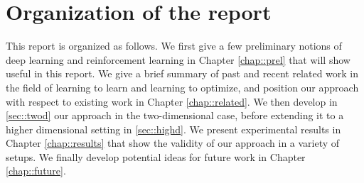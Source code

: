 {	
	\section{Organization of the report}
	This report is organized as follows. We first give a few preliminary notions of deep learning and reinforcement learning in Chapter \ref{chap::prel} that will show useful in this report. We give a brief summary of past and recent related work in the field of learning to learn and learning to optimize, and position our approach with respect to existing work in Chapter \ref{chap::related}. We then develop in \ref{sec::twod} our approach in the two-dimensional case, before extending it to a higher dimensional setting in \ref{sec::highd}. We present experimental results in Chapter \ref{chap::results} that show the validity of our approach in a variety of setups. We finally develop potential ideas for future work in Chapter \ref{chap::future}. 

	}